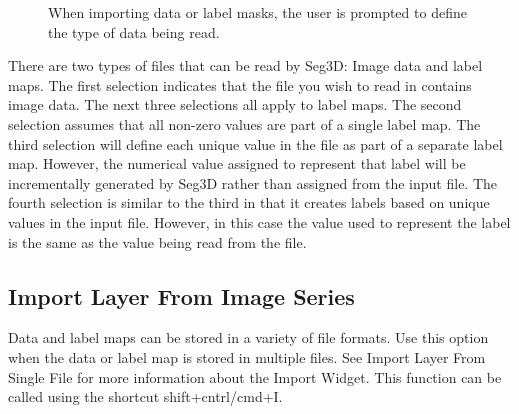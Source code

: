 \documentclass[fleqn,11pt,openany]{book}
\begin{document}
\begin{figure}[h!]
\caption{When importing data or label masks, the user is prompted to define the type of data being read.}\label{fig:ImportWidget}
\end{figure}

There are two types of files that can be read by Seg3D: Image data and label maps.  The first selection indicates that the file you wish to read in contains image data.  The next three selections all apply to label maps.  The second selection assumes that all non-zero values are part of a single label map.  The third selection will define each unique value in the file as part of a separate label map. However, the numerical value assigned to represent that label will be incrementally generated by Seg3D rather than assigned from the input file. The fourth selection is similar to the third in that it creates labels based on unique values in the input file.  However, in this case the value used to represent the label is the same as the value being read from the file.

\subsection{Import Layer From Image Series}
Data and label maps can be stored in a variety of file formats.  Use this option when the data or label map is stored in multiple files. See Import Layer From Single File for more information about the Import Widget. This function can be called using the shortcut shift+cntrl/cmd+I.
\end{document}
